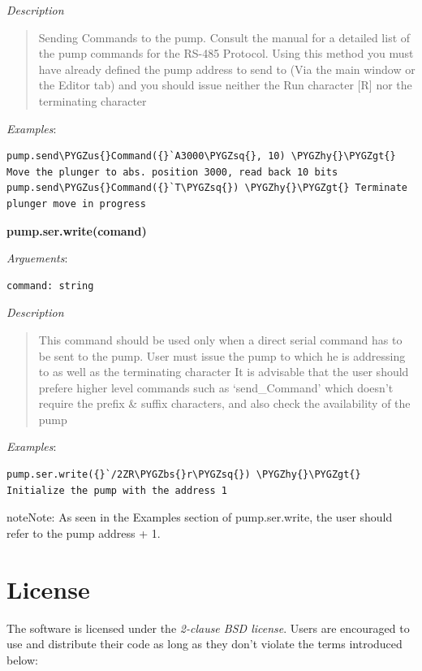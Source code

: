 \documentclass[letterpaper,10pt,english]{sphinxmanual}
\def\PYGZbs{\char`\\}
\def\PYGZus{\char`\_}
\def\PYGZgt{\char`\>}
\def\PYGZhy{\char`\-}
\def\PYGZsq{\char`\'}
\begin{document}
\emph{Description}
\begin{quote}

Sending Commands to the pump.
Consult the manual for a detailed list of the pump commands for the RS-485 Protocol.
Using this method you must have already defined the pump address to send to (Via
the main window or the Editor tab) and you should issue neither
the Run character {[}R{]} nor the terminating character
\end{quote}

\emph{Examples}:

\begin{Verbatim}[commandchars=\\\{\}]
pump.send\PYGZus{}Command({}`A3000\PYGZsq{}, 10) \PYGZhy{}\PYGZgt{} Move the plunger to abs. position 3000, read back 10 bits
pump.send\PYGZus{}Command({}`T\PYGZsq{}) \PYGZhy{}\PYGZgt{} Terminate plunger move in progress
\end{Verbatim}

\textbf{pump.ser.write(comand)}

\emph{Arguements}:

\begin{Verbatim}[commandchars=\\\{\}]
command: string
\end{Verbatim}

\emph{Description}
\begin{quote}

This command should be used only when a direct serial command has to be sent to the pump.
User must issue the pump to which he is addressing to as well as the terminating character
It is advisable that the user should prefere higher level commands such as `send\_Command'
which doesn't require the prefix \& suffix characters, and also check the availability of the pump
\end{quote}

\emph{Examples}:

\begin{Verbatim}[commandchars=\\\{\}]
pump.ser.write({}`/2ZR\PYGZbs{}r\PYGZsq{}) \PYGZhy{}\PYGZgt{} Initialize the pump with the address 1
\end{Verbatim}

\begin{notice}{note}{Note:}
As seen in the Examples section of pump.ser.write, the user should refer to the pump
address + 1.
\end{notice}


\section{License}
\label{license::doc}\label{license:license}
The software is licensed under the \emph{2-clause BSD license}.
Users are encouraged to use and distribute their code as long as they don't violate the
terms introduced below:
\end{document}
